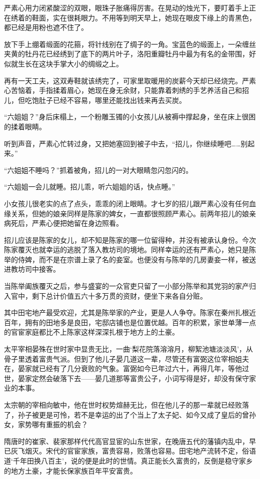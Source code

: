 严素心用力闭紧酸涩的双眼，眼珠子胀痛得厉害。在晃动的烛光下，要盯着手上正在绣着的鞋面，实在很耗眼力。不用等到明天早上，她现在眼皮下缘上的青黑色，都已经是用粉也遮不住了。

放下手上绷着缎面的花箍，将针线别在了绸子的一角。宝蓝色的缎面上，一朵缠丝夹黄的牡丹花已经绣到了底下的两片叶子，洛阳重瓣牡丹中最为有名的金带围，好似就生长在这块手掌大小的绸缎之上。

再有一天工夫，这双寿鞋就该绣完了，可家里取暖用的炭薪今天却已经烧完。严素心苦恼着，手指揉着眉心，她现在身无余财，只能靠着刺绣的手艺养活自己和招儿，但吃饱肚子已经不容易，哪里还能找出钱来再去买炭。

“六姐姐？”身后床榻上，一个粉雕玉镯的小女孩儿从被褥中撑起身，坐在床上很困的揉着眼睛。

听到声音，严素心忙转过身，又把她塞回到被子中去，“招儿，你继续睡吧……别起来。”

“六姐姐不睡吗？”抓着被角，招儿的一对大眼睛忽闪忽闪的。

“六姐姐一会儿就睡。招儿乖，听六姐姐的话，快点睡。”

小女孩儿很老实的点了点头，乖乖的闭上眼睛。才七岁的招儿跟严素心没有任何血缘关系，但她的娘亲同样是陈家的婢女，一直都很照顾严素心。前两年招儿的娘亲病死后，严素心便把她留在身边照看。

招儿应该是陈家的女儿，却不知是陈家的哪一位留得种，并没有被承认身份。今次陈家覆灭也就幸运的逃脱了落入教坊司的境地。同样幸运的还有严素心，她只是陈举的侍婢，而不是在宗谱上录了名的妾室。也便没有与陈举的几房妻妾一样，被送进教坊司中接客。

当陈举阖族覆灭之后，参与盛宴的一众官吏只留了一小部分陈举和其党羽的家产归入官中，剩下总计价值五六十多万贯的资财，便坐下来各自分赃。

其中田宅地产最受欢迎，尤其是陈举家的产业，更是人人争夺。陈家在秦州扎根近百年，拥有的田地多是良田，宅邸店铺也是位置优越。百年的积累，家世单薄一点的官宦家庭都比不上陈家这样深深扎根于地方上的土豪。

太平宰相晏殊在世时家中显贵无比，一曲‘梨花院落溶溶月，柳絮池塘淡淡风’，从骨子里透着富贵气派。但到了他儿子晏几道这一辈，尽管还有富弼这位宰相姐夫在，晏家就已经有了几分衰败的气象。富弼如今已年过六十，再得几年，等他过世，晏家定然会破落下去——晏几道那等富贵公子，小词写得是好，却没有保守家业的本事。

太宗朝的宰相向敏中，他在世时权势煊赫无比，但在他儿子的那一辈就已经败落了，孙子被更是可怜，若不是幸运的出了个当上了太子妃、如今又成了皇后的曾孙女，家势哪有重振的机会？

隋唐时的崔家、裴家那样代代高官显宦的山东世家，在晚唐五代的藩镇内乱中，早已灰飞烟灭。宋代的官宦家族，富贵容易，败落也容易。田宅地产流转不定，俗语道‘千年田换八百主’，说的便是此时的世情。真正能长久富贵的，反倒是稳守家乡的地方土豪，才能长保家族百年平安富贵。

